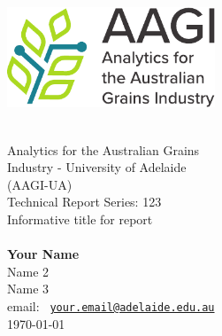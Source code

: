 \documentclass[12pt]{article}
\begin{document}
  \frontmatter

  \thispagestyle{empty}
  \vspace*{-30mm}

  \begin{center}
    \includegraphics[height=3cm]{assets/AAGI_logo.pdf}    
  \end{center}

  \vfill

  \begin{flushright}
    \HRule\\[5mm]

    \huge
    \textcolor{aagiblue}{\sbf Analytics for the Australian Grains\\
      Industry - University of Adelaide\\
      (AAGI-UA)\\
      Technical Report Series: 123}\\[6mm]

    {\sbf Informative title for report}\\
    \Large
    \vspace{2mm}{\sbf Report for $<$Project Number$>$}\\[5mm]

    \sf\normalsize
    \textbf{Your Name}\\
    Name 2\\
    Name 3\\
    \vspace*{0.4cm}
    email:\; \texttt{%
      \href{mailto:your.email@adelaide.edu.au}%
      {your.email@adelaide.edu.au}}\\[8mm]
      
    \today\\
    \HRule
  \end{flushright}

  \vfill

  \noindent{}
  \vspace*{-30mm}
  
\end{document}
